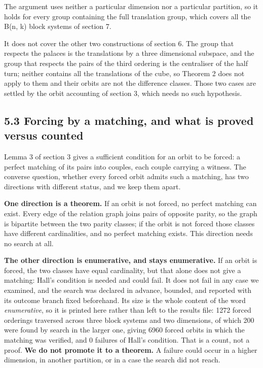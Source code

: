 \documentclass[11pt,a4paper]{article}
\begin{document}
The argument uses neither a particular dimension nor a particular partition, so it holds for every group containing the full translation group, which covers all the B(n, k) block systems of section 7.

It does not cover the other two constructions of section 6. The group that respects the palaces is the translations by a three dimensional subspace, and the group that respects the pairs of the third ordering is the centraliser of the half turn; neither contains all the translations of the cube, so Theorem 2 does not apply to them and their orbits are not the difference classes. Those two cases are settled by the orbit accounting of section 3, which needs no such hypothesis.

\subsection*{5.3 Forcing by a matching, and what is proved versus counted}

Lemma 3 of section 3 gives a sufficient condition for an orbit to be forced: a perfect matching of its pairs into couples, each couple carrying a witness. The converse question, whether every forced orbit admits such a matching, has two directions with different status, and we keep them apart.

\textbf{One direction is a theorem.} If an orbit is not forced, no perfect matching can exist. Every edge of the relation graph joins pairs of opposite parity, so the graph is bipartite between the two parity classes; if the orbit is not forced those classes have different cardinalities, and no perfect matching exists. This direction needs no search at all.

\textbf{The other direction is enumerative, and stays enumerative.} If an orbit is forced, the two classes have equal cardinality, but that alone does not give a matching: Hall's condition is needed and could fail. It does not fail in any case we examined, and the search was declared in advance, bounded, and reported with its outcome branch fixed beforehand. Its size is the whole content of the word \emph{enumerative}, so it is printed here rather than left to the results file: 1272 forced orderings traversed across three block systems and two dimensions, of which 200 were found by search in the larger one, giving 6960 forced orbits in which the matching was verified, and 0 failures of Hall's condition. That is a count, not a proof. \textbf{We do not promote it to a theorem.} A failure could occur in a higher dimension, in another partition, or in a case the search did not reach.
\end{document}
